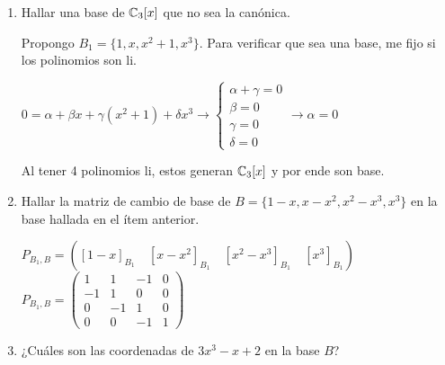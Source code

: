\item \begin{enumerate}
        \item Hallar una base de $\mathbb{C}_3[x]$ que no sea la canónica.
            \begin{mdframed}[style=s]
                Propongo $B_1=\{1,x,x^2+1,x^3\}$. Para verificar que sea una base, me fijo si los polinomios son li.
                \begin{center}
                    $0=\alpha+\beta x+\gamma (x^2+1)+\delta x^3\to\begin{cases}
                        \alpha+\gamma=0\\
                        \beta=0\\
                        \gamma=0\\
                        \delta=0
                    \end{cases}\to\alpha=0$
                \end{center}
                Al tener 4 polinomios li, estos generan $\mathbb{C}_3[x]$ y por ende son base.
            \end{mdframed}
        \item Hallar la matriz de cambio de base de $B=\{1-x,x-x^2,x^2-x^3,x^3\}$ en la base hallada en el ítem anterior.
            \begin{mdframed}[style=s]
                \begin{center}
                    $P_{B_1,B}=\left([1-x]_{B_1}\quad[x-x^2]_{B_1}\quad[x^2-x^3]_{B_1}\quad[x^3]_{B_1}\right)$\\
                    $P_{B_1,B}=\begin{pmatrix}
                        1&1&-1&0\\-1&1&0&0\\0&-1&1&0\\0&0&-1&1
                    \end{pmatrix}$
                \end{center}
            \end{mdframed}
        \item ¿Cuáles son las coordenadas de $3x^3-x+2$ en la base $B$?
\end{enumerate}

